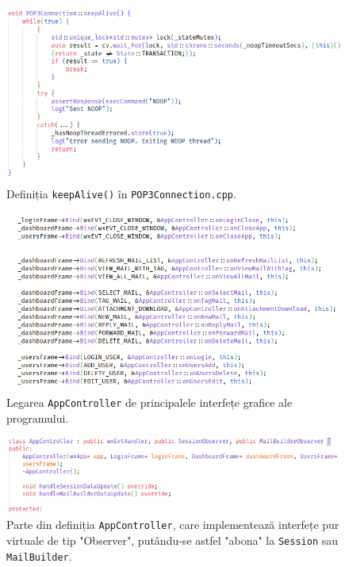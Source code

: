 \documentclass[runningheads]{llncs}
\begin{document}
\begin{figure}
    \centering
    \includegraphics[width=\textwidth]{keepAlive.png}
    \caption{Definiția \texttt{keepAlive()} în \texttt{POP3Connection.cpp}.}
    \label{fig:keepalive}
\end{figure}

\begin{figure}
    \centering
    \includegraphics[width=\textwidth]{binding.png}
    \caption{Legarea \texttt{AppController} de principalele interfețe grafice ale programului.}
    \label{fig:wxEvents}
\end{figure}

\begin{figure}
    \centering
    \includegraphics[width=\textwidth]{appControllerSubscribe.png}
    \caption{Parte din definiția \texttt{AppController}, care implementează interfețe pur virtuale de tip "Observer", putându-se astfel "abona" la \texttt{Session} sau \texttt{MailBuilder}.}
    \label{fig:subscribers}
\end{figure}
\end{document}
